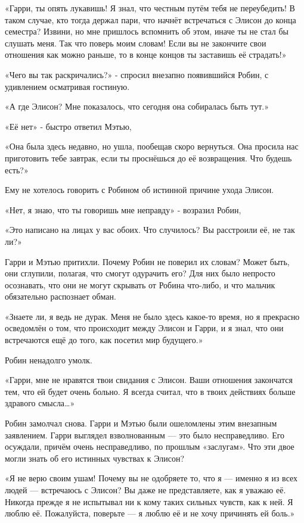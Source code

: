 \documentclass[a4paper,12pt]{book}
\begin{document}
\par
«Гарри, ты опять лукавишь! Я знал, что честным путём тебя не переубедить! В таком случае, кто тогда держал пари, что начнёт встречаться с Элисон до конца семестра? Извини, но мне пришлось вспомнить об этом, иначе ты не стал бы слушать меня. Так что поверь моим словам! Если вы не закончите свои отношения как можно раньше, то в конце концов ты заставишь её страдать!»
\par
«Чего вы так раскричались?» - спросил внезапно появившийся Робин, с удивлением осматривая гостиную.
\par
«А где Элисон? Мне показалось, что сегодня она собиралась быть тут.»
\par
«Её нет» - быстро ответил Мэтью,
\par
«Она была здесь недавно, но ушла, пообещав скоро вернуться. Она просила нас приготовить тебе завтрак, если ты проснёшься до её возвращения. Что будешь есть?»
\par
Ему не хотелось говорить с Робином об истинной причине ухода Элисон.
\par
«Нет, я знаю, что ты говоришь мне неправду» - возразил Робин,
\par
«Это написано на лицах у вас обоих. Что случилось? Вы расстроили её, не так ли?»
\par
Гарри и Мэтью притихли. Почему Робин не поверил их словам? Может быть, они сглупили, полагая, что смогут одурачить его? Для них было непросто осознавать, что они не могут скрывать от Робина что-либо, и что мальчик обязательно распознает обман.
\par
«Знаете ли, я ведь не дурак. Меня не было здесь какое-то время, но я прекрасно осведомлён о том, что происходит между Элисон и Гарри, и я знал, что они встречаются ещё до того, как посетил мир будущего.»
\par
Робин ненадолго умолк.
\par
«Гарри, мне не нравятся твои свидания с Элисон. Ваши отношения закончатся тем, что ей будет очень больно. Я всегда считал, что в твоих действиях больше здравого смысла…»
\par
Робин замолчал снова. Гарри и Мэтью были ошеломлены этим внезапным заявлением. Гарри выглядел взволнованным — это было несправедливо. Его осуждали, причём очень несправедливо, по прошлым «заслугам». Что эти двое могли знать об его истинных чувствах к Элисон?
\par
«Я не верю своим ушам! Почему вы не одобряете то, что я — именно я из всех людей — встречаюсь с Элисон? Вы даже не представляете, как я уважаю её. Никогда прежде я не испытывал ни к кому таких сильных чувств, как к ней. Я люблю её. Пожалуйста, поверьте — я люблю её и не хочу причинять ей боль.»
\end{document}
